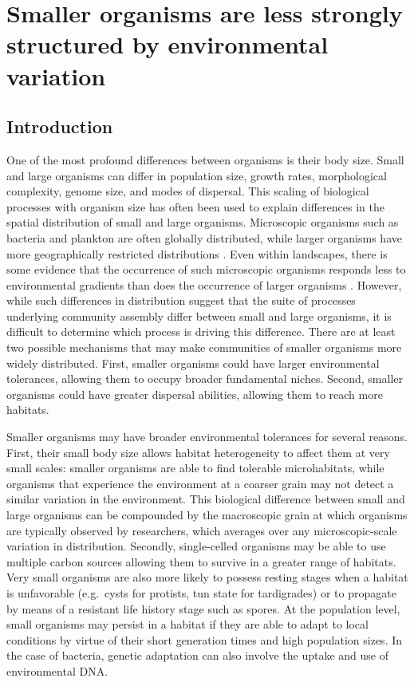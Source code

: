 \chapter{Smaller organisms are less strongly structured by environmental variation}
\label{chap:organism-size}

\section{Introduction}\label{introduction}

One of the most profound differences between organisms is their body
size. Small and large organisms can differ in population size, growth
rates, morphological complexity, genome size, and modes of dispersal.
This scaling of biological processes with organism size has often been
used to explain differences in the spatial distribution of small and
large organisms. Microscopic organisms such as bacteria and plankton are
often globally distributed, while larger organisms have more
geographically restricted distributions \citep{Fenchel2004}. Even within
landscapes, there is some evidence that the occurrence of such
microscopic organisms responds less to environmental gradients than does
the occurrence of larger organisms \citep{Farjalla2012, Fierer2011}.
However, while such differences in distribution suggest that the suite
of processes underlying community assembly differ between small and
large organisms, it is difficult to determine which process is driving
this difference. There are at least two possible mechanisms that may
make communities of smaller organisms more widely distributed. First,
smaller organisms could have larger environmental tolerances, allowing
them to occupy broader fundamental niches. Second, smaller organisms
could have greater dispersal abilities, allowing them to reach more
habitats.

Smaller organisms may have broader environmental tolerances for several
reasons. First, their small body size allows habitat heterogeneity to
affect them at very small scales: smaller organisms are able to find
tolerable microhabitats, while organisms that experience the environment
at a coarser grain may not detect a similar variation in the
environment. This biological difference between small and large
organisms can be compounded by the macroscopic grain at which organisms
are typically observed by researchers, which averages over any
microscopic-scale variation in distribution. Secondly, single-celled
organisms may be able to use multiple carbon sources
\citep{Langenheder2007} allowing them to survive in a greater range of
habitats. Very small organisms are also more likely to possess resting
stages when a habitat is unfavorable (e.g.~cysts for protists, tun state
for tardigrades) or to propagate by means of a resistant life history
stage such as spores. At the population level, small organisms may
persist in a habitat if they are able to adapt to local conditions by
virtue of their short generation times and high population sizes. In the
case of bacteria, genetic adaptation can also involve the uptake and use
of environmental DNA.

